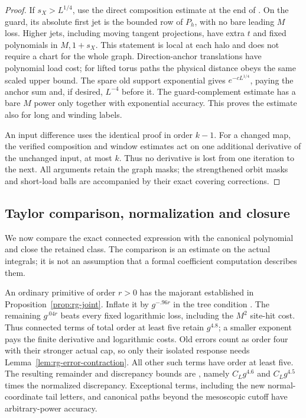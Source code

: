 \begin{proof}
If $s_X>L^{1/4}$, use the direct composition estimate at the end of
.  On the guard, its absolute first jet is
the bounded row of $P_h$, with no bare leading $M$ loss.  Higher jets,
including moving tangent projections, have extra $t$ and fixed
polynomials in $M,1+s_X$.  This statement is local at each halo and
does not require a chart for the whole graph.  Direction-anchor
translations have polynomial load cost; for lifted torus paths the
physical distance obeys the same scaled upper bound.  The spare old
support exponential gives $e^{-cL^{1/4}}$, paying the anchor sum and,
if desired, $L^{-4}$ before it.  The guard-complement estimate has a
bare $M$ power only together with exponential accuracy.  This proves
the estimate also for long and winding labels.

An input difference uses the identical proof in order $k-1$.  For a
changed map, the verified composition and window estimates act on
one additional derivative of the unchanged input, at most $k$.
Thus no derivative is lost from one iteration to the next.  All
arguments retain the graph masks; the strengthened orbit masks and
short-load balls are accompanied by their exact covering corrections.
\end{proof}

\subsection{Taylor comparison, normalization and closure}
\label{subsec:rg-closure}

We now compare the exact connected expression with the canonical
polynomial and close the retained class.  The comparison is an
estimate on the actual integrals; it is not an assumption that a
formal coefficient computation describes them.

An ordinary primitive of order $r>0$ has the majorant established in
Proposition~\ref{prop:rg-joint}.  Inflate it by $g^{-.96r}$ in the
tree condition .  The remaining $g^{.04r}$
beats every fixed logarithmic loss, including the $M^2$ site-hit cost.
Thus connected terms of total order at least five retain $g^{4.8}$;
a smaller exponent pays the finite derivative and logarithmic costs.
Old errors count as order four with their stronger actual cap, so
only their isolated response needs Lemma~\ref{lem:rg-error-contraction}.
All other such terms have order at least five.  The resulting
remainder and discrepancy bounds are ,
namely $C_Lg^{4.6}$ and $C_Lg^{4.5}$ times the normalized discrepancy.
Exceptional terms, including the new normal-coordinate tail letters,
and canonical paths beyond the mesoscopic cutoff have arbitrary-power
accuracy.

